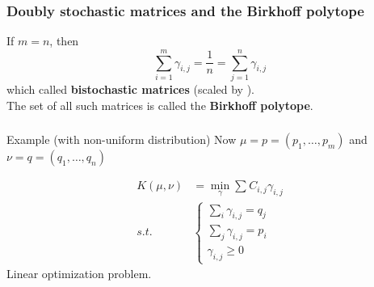\documentclass{beamer}
\begin{document}
\begin{frame}
  \frametitle{Doubly stochastic matrices and the Birkhoff polytope}
  If $m=n$, then
  \begin{equation}
    \sum_{i=1}^{m} \gamma_{i,j} = \frac{1}{n} = \sum_{j=1}^{n} \gamma_{i,j}
  \end{equation}
  which called \textbf{bistochastic matrices} (scaled by ).\\
  The set of all such matrices is called the \textbf{Birkhoff polytope}.

\end{frame}

\begin{frame}
  \frametitle{}
  \begin{block}{Example (with non-uniform distribution)}
    Now $\mu = p = (p_1, \dots, p_m)$ and $\nu = q = (q_1, \dots, q_n)$
  \end{block}
  \begin{equation}
    \begin{aligned}
      K(\mu, \nu) &= \min_\gamma \sum_{}^{} C_{i,j} \gamma_{i,j} \\
      s.t. & \begin{cases}
        \sum_{i}^{} \gamma_{i,j} = q_j \\
        \sum_{j}^{} \gamma_{i,j} = p_i \\
        \gamma_{i,j} \ge 0
      \end{cases}
    \end{aligned}
  \end{equation}
  Linear optimization problem.
\end{frame}

\end{document}
